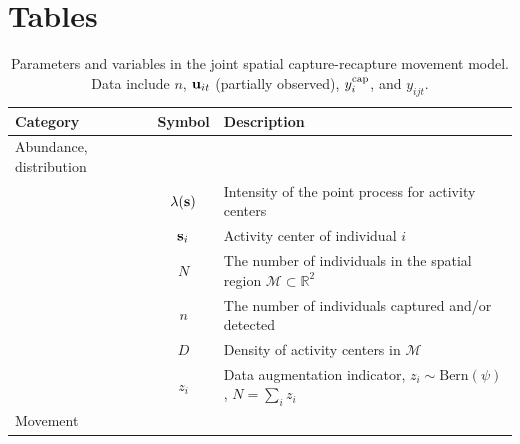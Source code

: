 \documentclass[12pt]{article}
\newcommand{\bs}{{\bf s}}
\newcommand{\bsi}{{\bf s}_i}
\newcommand{\buit}{{\bf u}_{it}}
\begin{document}





\clearpage

\section*{Tables}


\begin{table}[h!]
  \caption{Parameters and variables in the joint spatial
    capture-recapture movement model. Data include $n$, $\buit$
    (partially observed), $y_i^{\rm cap}$, and $y_{ijt}$.}
  \begin{tabular}{p{3.5cm}cp{11cm}}
    \hline
    Category                & Symbol                    & Description                                                                       \\
    \hline
    Abundance, distribution &                           &                                                                                   \\
                            & $\lambda(\bs)$            & Intensity of the point process for activity centers                               \\
                            & $\bsi$                    & Activity center of individual $i$                                                 \\
                            & $N$                       & The number of individuals in the spatial region $\mathcal M \subset \mathbb{R}^2$ \\
                            & $n$                       & The number of individuals captured and/or detected                                \\
                            & $D$                       & Density of activity centers in $\mathcal M$                                       \\
                            & $z_i$                     & Data augmentation indicator, $z_i \sim \mathrm{Bern}(\psi)$, $N=\sum_i z_i$       \\
    Movement                &                           &                                                                                   \\

\end{tabular}
\end{table}
\end{document}
